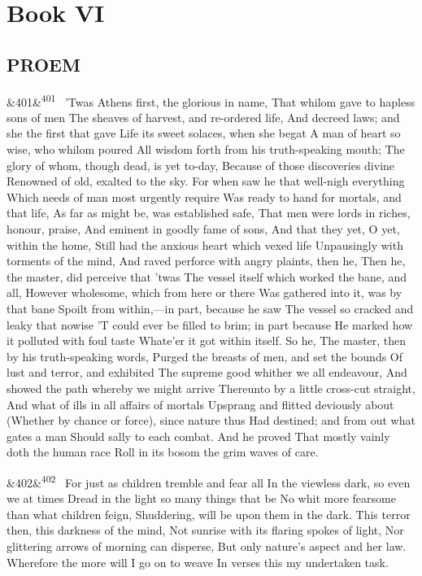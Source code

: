 \documentclass[12pt]{article}
\newcommand{\para}[1][]{\par\noindent\ifx&#1&\else\textsuperscript{\footnotesize #1}~\fi}
\begin{document}
\section*{Book VI}

\subsection*{PROEM}

\para[401] 'Twas Athens first, the glorious in name, That whilom gave to hapless sons of men The sheaves of harvest, and re-ordered life, And decreed laws; and she the first that gave Life its sweet solaces, when she begat A man of heart so wise, who whilom poured All wisdom forth from his truth-speaking mouth; The glory of whom, though dead, is yet to-day, Because of those discoveries divine Renowned of old, exalted to the sky. For when saw he that well-nigh everything Which needs of man most urgently require Was ready to hand for mortals, and that life, As far as might be, was established safe, That men were lords in riches, honour, praise, And eminent in goodly fame of sons, And that they yet, O yet, within the home, Still had the anxious heart which vexed life Unpausingly with torments of the mind, And raved perforce with angry plaints, then he, Then he, the master, did perceive that 'twas The vessel itself which worked the bane, and all, However wholesome, which from here or there Was gathered into it, was by that bane Spoilt from within,---in part, because he saw The vessel so cracked and leaky that nowise 'T could ever be filled to brim; in part because He marked how it polluted with foul taste Whate'er it got within itself. So he, The master, then by his truth-speaking words, Purged the breasts of men, and set the bounds Of lust and terror, and exhibited The supreme good whither we all endeavour, And showed the path whereby we might arrive Thereunto by a little cross-cut straight, And what of ills in all affairs of mortals Upsprang and flitted deviously about (Whether by chance or force), since nature thus Had destined; and from out what gates a man Should sally to each combat. And he proved That mostly vainly doth the human race Roll in its bosom the grim waves of care.

\para[402] For just as children tremble and fear all In the viewless dark, so even we at times Dread in the light so many things that be No whit more fearsome than what children feign, Shuddering, will be upon them in the dark. This terror then, this darkness of the mind, Not sunrise with its flaring spokes of light, Nor glittering arrows of morning can disperse, But only nature's aspect and her law. Wherefore the more will I go on to weave In verses this my undertaken task.
\end{document}
